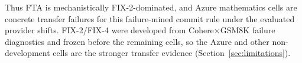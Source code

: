 Thus FTA is mechanistically FIX-2-dominated, and Azure mathematics cells are concrete transfer
failures for this failure-mined commit rule under the evaluated provider shifts. FIX-2/FIX-4 were
developed from Cohere$\times$GSM8K failure diagnostics and frozen before the remaining cells, so
the Azure and other non-development cells are the stronger transfer evidence
(Section~\ref{sec:limitations}).
